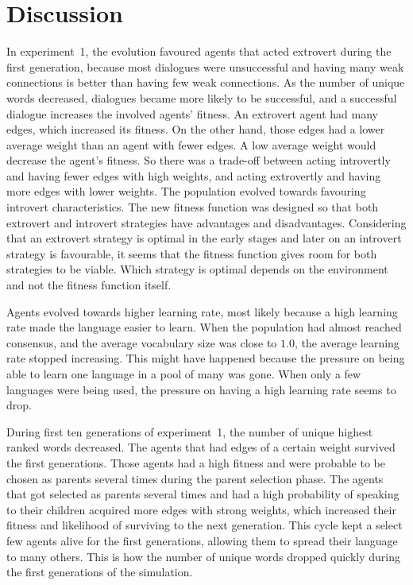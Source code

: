 \acresetall
\chapter{Discussion}\label{ch:Discussion}
In experiment~1, the evolution favoured agents that acted extrovert during the first generation, because most dialogues were unsuccessful and having many weak connections is better than having few weak connections. As the number of unique words decreased, dialogues became more likely to be successful, and a successful dialogue increases the involved agents' fitness. An extrovert agent had many edges, which increased its fitness. On the other hand, those edges had a lower average weight than an agent with fewer edges. A low average weight would decrease the agent's fitness. So there was a trade-off between acting introvertly and having fewer edges with high weights, and acting extrovertly and having more edges with lower weights. The population evolved towards favouring introvert characteristics. The new fitness function was designed so that both extrovert and introvert strategies have advantages and disadvantages. Considering that an extrovert strategy is optimal in the early stages and later on an introvert strategy is favourable, it seems that the fitness function gives room for both strategies to be viable. Which strategy is optimal depends on the environment and not the fitness function itself. 

Agents evolved towards higher learning rate, most likely because a high learning rate made the language easier to learn. When the population had almost reached consensus, and the average vocabulary size was close to $1.0$, the average learning rate stopped increasing. This might have happened because the pressure on being able to learn one language in a pool of many was gone. When only a few languages were being used, the pressure on having a high learning rate seems to drop. 

During first ten generations of experiment~1, the number of unique highest ranked words decreased. The agents that had edges of a certain weight survived the first generations. Those agents had a high fitness and were probable to be chosen as parents several times during the parent selection phase. The agents that got selected as parents several times and had a high probability of speaking to their children acquired more edges with strong weights, which increased their fitness and likelihood of surviving to the next generation. This cycle kept a select few agents alive for the first generations, allowing them to spread their language to many others. This is how the number of unique words dropped quickly during the first generations of the simulation. 

